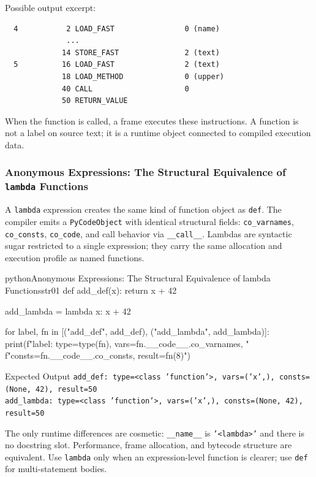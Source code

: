 \documentclass[a4paper,twoside]{report}
\begin{document}
Possible output excerpt:

\begin{verbatim}
  4           2 LOAD_FAST                0 (name)
              ...
             14 STORE_FAST               2 (text)
  5          16 LOAD_FAST                2 (text)
             18 LOAD_METHOD              0 (upper)
             40 CALL                     0
             50 RETURN_VALUE
\end{verbatim}

When the function is called, a frame executes these instructions. A function is not a label on source text; it is a runtime object connected to compiled execution data.

\subsubsection{Anonymous Expressions: The Structural Equivalence of \texttt{lambda} Functions}

A \texttt{lambda} expression creates the same kind of function object as \texttt{def}. The compiler emits a \texttt{PyCodeObject} with identical structural fields: \texttt{co\_varnames}, \texttt{co\_consts}, \texttt{co\_code}, and call behavior via \texttt{\_\_call\_\_}. Lambdas are syntactic sugar restricted to a single expression; they carry the same allocation and execution profile as named functions.

\begin{codebox}[]{python}{Anonymous Expressions: The Structural Equivalence of lambda Functions}{str01}
def add_def(x):
    return x + 42

add_lambda = lambda x: x + 42

for label, fn in [("add_def", add_def), ("add_lambda", add_lambda)]:
    print(f"{label}: type={type(fn)}, vars={fn.__code__.co_varnames}, "
          f"consts={fn.__code__.co_consts}, result={fn(8)}")
\end{codebox}


\begin{iobox}{Expected Output}
\texttt{add\_def: type=<class 'function'>, vars=('x',), consts=(None, 42), result=50} \\
\texttt{add\_lambda: type=<class 'function'>, vars=('x',), consts=(None, 42), result=50} \\
\end{iobox}




The only runtime differences are cosmetic: \texttt{\_\_name\_\_} is \texttt{'<lambda>'} and there is no docstring slot. Performance, frame allocation, and bytecode structure are equivalent. Use \texttt{lambda} only when an expression-level function is clearer; use \texttt{def} for multi-statement bodies.
\end{document}
